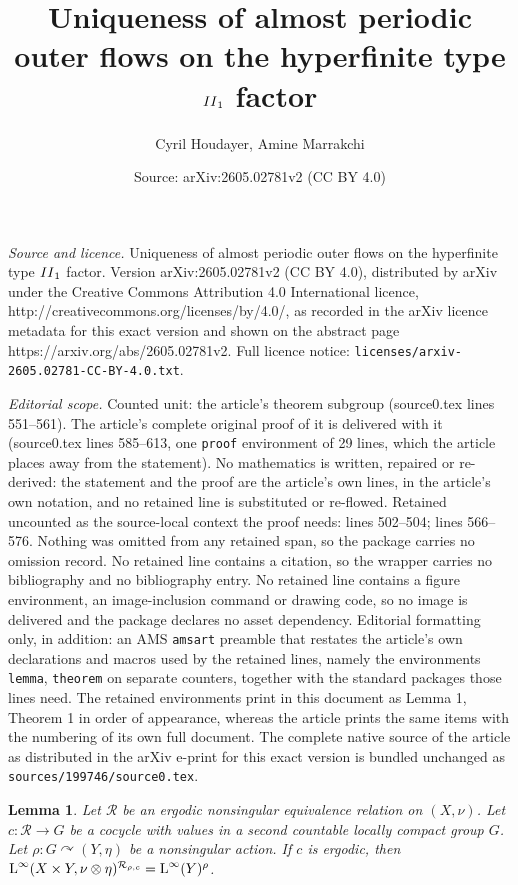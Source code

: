 \documentclass[10pt,a4paper]{amsart}
\title{Uniqueness of almost periodic outer flows on the hyperfinite type $\II_1$ factor}
\author{Cyril Houdayer, Amine Marrakchi}
\date{Source: arXiv:2605.02781v2 (CC BY 4.0)}
\newcommand{\II}{{\rm II}}
\newtheorem{lemma}{Lemma}
\newcommand{\cR}{\mathcal{R}}
\newcommand{\rL}{\mathord{\text{\rm L}}}
\begin{document}
\maketitle

\noindent\emph{Source and licence.} Uniqueness of almost periodic outer flows on the hyperfinite type $\II_1$ factor. Version arXiv:2605.02781v2 (CC BY 4.0), distributed by arXiv under the Creative Commons Attribution 4.0 International licence, http://creativecommons.org/licenses/by/4.0/, as recorded in the arXiv licence metadata for this exact version and shown on the abstract page https://arxiv.org/abs/2605.02781v2. Full licence notice: \texttt{licenses/arxiv-2605.02781-CC-BY-4.0.txt}.\par\smallskip

\noindent\textit{Editorial scope.} Counted unit: the article's theorem subgroup (source0.tex lines 551--561). The article's complete original proof of it is delivered with it (source0.tex lines 585--613, one \texttt{proof} environment of 29 lines, which the article places away from the statement). No mathematics is written, repaired or re-derived: the statement and the proof are the article's own lines, in the article's own notation, and no retained line is substituted or re-flowed.  Retained uncounted as the source-local context the proof needs: lines 502--504; lines 566--576.  Nothing was omitted from any retained span, so the package carries no omission record.  No retained line contains a citation, so the wrapper carries no bibliography and no bibliography entry.  No retained line contains a figure environment, an image-inclusion command or drawing code, so no image is delivered and the package declares no asset dependency.  Editorial formatting only, in addition: an AMS \texttt{amsart} preamble that restates the article's own declarations and macros used by the retained lines, namely the environments \texttt{lemma}, \texttt{theorem} on separate counters, together with the standard packages those lines need.  The retained environments print in this document as Lemma 1, Theorem 1 in order of appearance, whereas the article prints the same items with the numbering of its own full document.  The complete native source of the article as distributed in the arXiv e-print for this exact version is bundled unchanged as \texttt{sources/199746/source0.tex}.
\begin{lemma} \label{dense range induced equivalence relation}
    Let $\cR$ be an ergodic nonsingular equivalence relation on $(X,\nu)$. Let $c : \cR \rightarrow G$ be a cocycle with values in a second countable locally compact group $G$. Let $\rho : G \curvearrowright (Y,\eta)$ be a nonsingular action. If $c$ is ergodic, then $\rL^\infty(X \times Y, \nu \otimes \eta)^{\cR_{\rho,c}} = \rL^\infty(Y)^{\rho}$.
\end{lemma}
\end{document}
